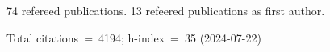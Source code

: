 74 refereed publications. 13 refeered publications as first author.

Total citations~=~4194; h-index~=~35 (2024-07-22)